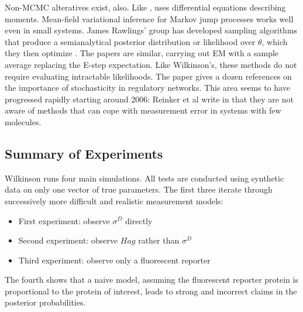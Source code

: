 \documentclass{article}
\begin{document}
Non-MCMC alteratives exist, also. Like \cite{milner2013moment}, \cite{zechner2012moment} uses differential equations describing moments. Mean-field variational inference for Markov jump processes \cite{opper2008variational} works well even in small systems. James Rawlings' group has developed sampling algorithms that produce a semianalytical posterior distribution or likelihood over $\theta$, which they then optimize \cite{gupta2014comparison,srivastava_rawlings2014stoch_opt}. The papers \cite{bayer2015stoch_em,horvath2008parameter,daigle2012accelerated} are similar, carrying out EM with a sample average replacing the E-step expectation. Like Wilkinson's, these methods do not require evaluating intractable likelihoods. The paper  \cite{reinker2006parameter} gives a dozen references on the importance of stochasticity in regulatory networks. This area seems to have progressed rapidly starting around 2006: Reinker et al write in \cite{reinker2006parameter} that they are not
aware of methods that can cope with measurement error in systems with few molecules.


\subsection{Summary of Experiments}

Wilkinson runs four main simulations. All tests are conducted using synthetic data on only one vector of true parameters. The first three iterate through successively more difficult and realistic measurement models:
\begin{itemize}
\item First experiment: observe $\sigma^D$  directly
\item Second experiment: observe $Hag$ rather than $\sigma^D$
\item Third experiment: observe only a fluorescent reporter
\end{itemize}

The fourth shows that a naive model, assuming the fluorescent reporter protein is proportional to the protein of interest, leads to strong and incorrect claims in the posterior probabilities. 
\end{document}
